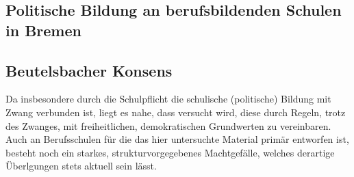 
\subsection{Politische Bildung an berufsbildenden Schulen in Bremen}


\subsection{Beutelsbacher Konsens \label{bbk}}%
Da insbesondere durch die Schulpflicht \autocite{BremSchulG} die schulische (politische) Bildung mit Zwang verbunden ist, liegt es nahe, dass versucht wird, diese durch Regeln, trotz des Zwanges, mit freiheitlichen, demokratischen Grundwerten zu vereinbaren. Auch an Berufsschulen für die das hier untersuchte Material primär entworfen ist, besteht noch ein starkes, strukturvorgegebenes Machtgefälle, welches derartige Überlgungen stets aktuell sein lässt. 

